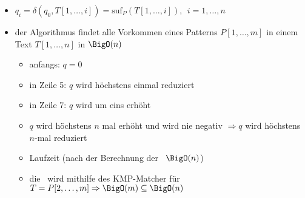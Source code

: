 \begin{itemize}[itemsep=-2pt]
	\item $q_i=\delta(q_0,T[1,\dots,i])=\text{suf}_P(T[1,\dots,i]),~~i=1,\dots,n$
	\item der Algorithmus findet alle Vorkommen eines Patterns $P[1,\dots,m]$ in einem Text $T[1,\dots,n]$ in $\BigO(n)$
		\vspace*{-1.5\baselineskip}\Proof\up
			\begin{itemize}[itemsep=-2pt]
				\item anfangs: $q=0$
				\item in Zeile 5: $q$ wird höchstens einmal reduziert
				\item in Zeile 7: $q$ wird um eins erhöht
				\item $q$ wird höchstens $n$ mal erhöht und wird nie negativ $\Rightarrow q$ wird höchstens $n$-mal reduziert
				\item Laufzeit (nach der Berechnung der \bound~$\BigO(n)$)
				\item die \bound~wird mithilfe des KMP-Matcher für $T=P[2,\dots,m] \Rightarrow \BigO(m)\subseteq\BigO(n)$
			\end{itemize}
\end{itemize}